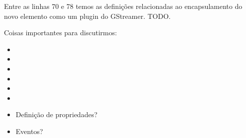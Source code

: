 Entre as linhas 70 e 78 temos as definições relacionadas ao encapsulamento do
novo elemento como um plugin do GStreamer.  TODO.



Coisas importantes para discutirmos:
\begin{itemize}
  \item {}
  \item {} 
  \item {} 
  \item {}
  \item {}
  \item {}
  \item Definição de propriedades?
  \item Eventos?
\end{itemize}




